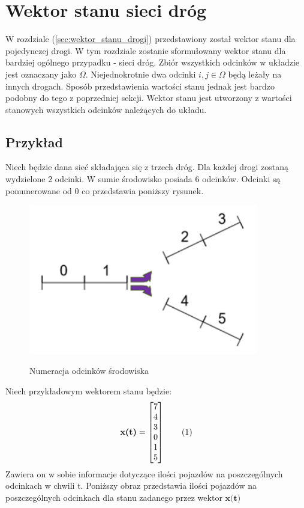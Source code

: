 \documentclass[12pt]{book}
\theoremstyle{plain}
\newcommand\addtag{\refstepcounter{equation}
\renewcommand{\labelenumii}{\theenumii}
\renewcommand{\theenumii}{\theenumi.\arabic{enumii}.}
\tag{\theequation}}
\begin{document}
\section {Wektor stanu sieci dróg}
W rozdziale (\ref{sec:wektor_stanu_drogi}) przedstawiony został wektor stanu dla pojedynczej drogi. W tym rozdziale zostanie sformułowany wektor stanu dla bardziej ogólnego przypadku - sieci dróg. Zbiór wszystkich odcinków w układzie jest oznaczany jako $\Omega$. Niejednokrotnie dwa odcinki $i,j \in \Omega$ będą leżały na innych drogach. Sposób przedstawienia wartości stanu jednak jest bardzo podobny do tego z poprzedniej sekcji. Wektor stanu jest utworzony z wartości stanowych wszystkich odcinków należących do układu.
\subsection{Przykład} \label{subsec:wektor_stanu_siec_przyklad}
Niech będzie dana sieć składająca się z trzech dróg. Dla każdej drogi zostaną wydzielone 2 odcinki. W sumie środowisko posiada 6 odcinków. Odcinki są ponumerowane od 0 co przedstawia poniższy rysunek.
\def \xzero {\begin{bmatrix}
		7 \\ 4 \\ 3 \\ 0 \\ 1 \\ 5
\end{bmatrix}}
	\begin{figure}[H]
	\centering
	\includegraphics[width=10cm]{images/env_11}
	\label{fig:env_11}
	\caption{Numeracja odcinków środowiska}
\end{figure}Niech przykładowym wektorem stanu będzie:
\[\textbf{x(t)}=\xzero \addtag \]
Zawiera on w sobie informacje dotyczące ilości pojazdów na poszczególnych odcinkach w chwili t. Poniższy obraz przedstawia ilości pojazdów na poszczególnych odcinkach dla stanu zadanego przez wektor $\textbf{x(t)}$
\end{document}
